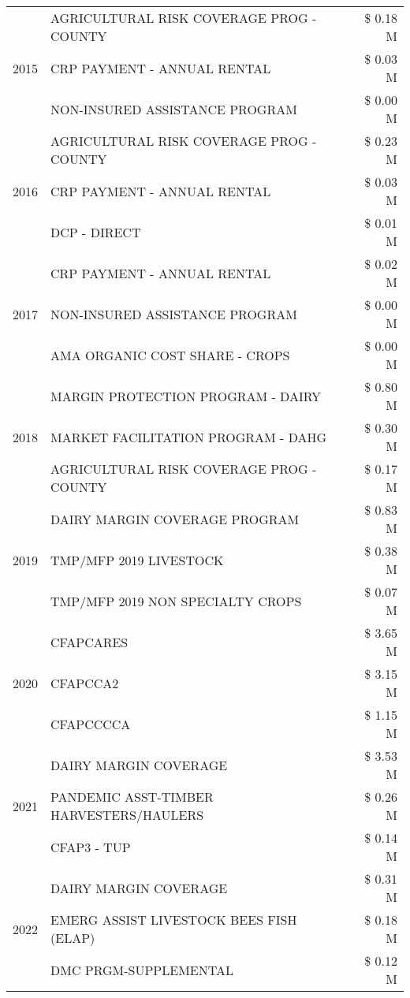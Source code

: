 \begin{tabular}{llr}
\cline{1-3}
\multirow[t]{3}{*}{2015} & AGRICULTURAL RISK COVERAGE PROG - COUNTY & \$ 0.18 M \\
 & CRP PAYMENT - ANNUAL RENTAL & \$ 0.03 M \\
 & NON-INSURED ASSISTANCE PROGRAM & \$ 0.00 M \\
\cline{1-3}
\multirow[t]{3}{*}{2016} & AGRICULTURAL RISK COVERAGE PROG - COUNTY & \$ 0.23 M \\
 & CRP PAYMENT - ANNUAL RENTAL & \$ 0.03 M \\
 & DCP - DIRECT & \$ 0.01 M \\
\cline{1-3}
\multirow[t]{3}{*}{2017} & CRP PAYMENT - ANNUAL RENTAL & \$ 0.02 M \\
 & NON-INSURED ASSISTANCE PROGRAM & \$ 0.00 M \\
 & AMA ORGANIC COST SHARE - CROPS & \$ 0.00 M \\
\cline{1-3}
\multirow[t]{3}{*}{2018} & MARGIN PROTECTION PROGRAM - DAIRY & \$ 0.80 M \\
 & MARKET FACILITATION PROGRAM - DAHG & \$ 0.30 M \\
 & AGRICULTURAL RISK COVERAGE PROG - COUNTY & \$ 0.17 M \\
\cline{1-3}
\multirow[t]{3}{*}{2019} & DAIRY MARGIN COVERAGE PROGRAM & \$ 0.83 M \\
 & TMP/MFP 2019 LIVESTOCK & \$ 0.38 M \\
 & TMP/MFP 2019 NON SPECIALTY CROPS & \$ 0.07 M \\
\cline{1-3}
\multirow[t]{3}{*}{2020} & CFAPCARES & \$ 3.65 M \\
 & CFAPCCA2 & \$ 3.15 M \\
 & CFAPCCCCA & \$ 1.15 M \\
\cline{1-3}
\multirow[t]{3}{*}{2021} & DAIRY MARGIN COVERAGE & \$ 3.53 M \\
 & PANDEMIC ASST-TIMBER HARVESTERS/HAULERS & \$ 0.26 M \\
 & CFAP3 - TUP & \$ 0.14 M \\
\cline{1-3}
\multirow[t]{3}{*}{2022} & DAIRY MARGIN COVERAGE & \$ 0.31 M \\
 & EMERG ASSIST LIVESTOCK BEES FISH (ELAP) & \$ 0.18 M \\
 & DMC PRGM-SUPPLEMENTAL & \$ 0.12 M \\
\cline{1-3}
\bottomrule
\end{tabular}
